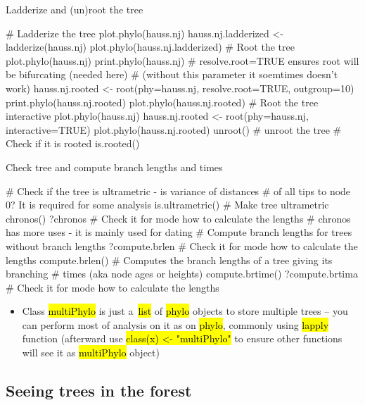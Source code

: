 \documentclass[compress, ucs, xelatex, 11pt, xcolor=svgnames,
  hyperref={
    bookmarks=true,
    unicode=true,
    colorlinks=true,
    pdftitle={Molecular data in R},
    plainpages=false,
    pdfauthor={Vojtech Zeisek},
    pdfsubject={Course about phylogeny and evolution in R},
    pdfcreator={XeLaTeX},
    pdfkeywords={R, evolution, phylogeny, molecular data},
    linkcolor=Tomato,
    anchorcolor=SaddleBrown,
    citecolor=Goldenrod,
    filecolor=DarkMagenta,
    menucolor=Sienna,
    urlcolor=DarkTurquoise,
    pdftex},
  url={hyphens, lowtilde} %
  ]{beamer}
\renewcommand{\texttt}[1]{\hl{\ttfamily #1}}
\begin{document}
\begin{frame}[fragile]{Ladderize and (un)root the tree}
  \begin{spluscode}
    # Ladderize the tree
    plot.phylo(hauss.nj)
    hauss.nj.ladderized <- ladderize(hauss.nj)
    plot.phylo(hauss.nj.ladderized)
    # Root the tree
    plot.phylo(hauss.nj)
    print.phylo(hauss.nj)
    # resolve.root=TRUE ensures root will be bifurcating (needed here)
    # (without this parameter it soemtimes doesn't work)
    hauss.nj.rooted <- root(phy=hauss.nj, resolve.root=TRUE, outgroup=10)
    print.phylo(hauss.nj.rooted)
    plot.phylo(hauss.nj.rooted)
    # Root the tree interactive
    plot.phylo(hauss.nj)
    hauss.nj.rooted <- root(phy=hauss.nj, interactive=TRUE)
    plot.phylo(hauss.nj.rooted)
    unroot() # unroot the tree
    # Check if it is rooted is.rooted()
  \end{spluscode}
\end{frame}

\begin{frame}[fragile]{Check tree and compute branch lengths and times}
  \begin{spluscode}
    # Check if the tree is ultrametric - is variance of distances
    # of all tips to node 0? It is required for some analysis
    is.ultrametric()
    # Make tree ultrametric
    chronos()
    ?chronos # Check it for mode how to calculate the lengths
    # chronos has more uses - it is mainly used for dating
    # Compute branch lengths for trees without branch lengths
    ?compute.brlen # Check it for mode how to calculate the lengths
    compute.brlen()
    # Computes the branch lengths of a tree giving its branching
    # times (aka node ages or heights)
    compute.brtime()
    ?compute.brtima # Check it for mode how to calculate the lengths
  \end{spluscode}
  \begin{itemize}
    \item Class \texttt{multiPhylo} is just a~\texttt{list} of \texttt{phylo} objects to store multiple trees -- you can perform most of analysis on it as on \texttt{phylo}, commonly using \texttt{lapply} function (afterward use \texttt{class(x) <- "multiPhylo"} to ensure other functions will see it as \texttt{multiPhylo} object)
  \end{itemize}
\end{frame}

\subsection{Seeing trees in the forest}
\end{document}
